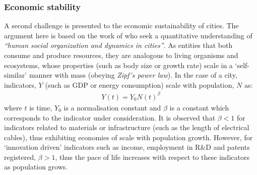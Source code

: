 \subsubsection*{Economic stability}
A second challenge is presented to the economic sustainability of cities. The argument here is based on the work of \citet{Bettencourt2007} who seek a quantitative understanding of \emph{``human social organization and dynamics in cities''}. As entities that both consume and produce resources, they are analogous to living organisms and ecosystems, whose properties (such as body size or growth rate) scale in a `self-similar' manner with mass (obeying \emph{Zipf's power law}). In the case of a city, indicators, $Y$ (such as GDP or energy consumption) scale with population, $N$ as:
\begin{align} \label{eq:urban_scale}
	Y(t)=Y_0N(t)^{\beta}
\end{align}
where $t$ is time, $Y_0$ is a normalisation constant and $\beta$ is a constant which corresponds to the indicator under consideration. It is observed that $\beta<1$ for indicators related to materials or infrastructure (such as the length of electrical cables), thus exhibiting economies of scale with population growth. However, for `innovation driven' indicators such as income, employment in R\&D and patents registered, $\beta>1$, thus the pace of life increases with respect to these indicators as population grows. %

